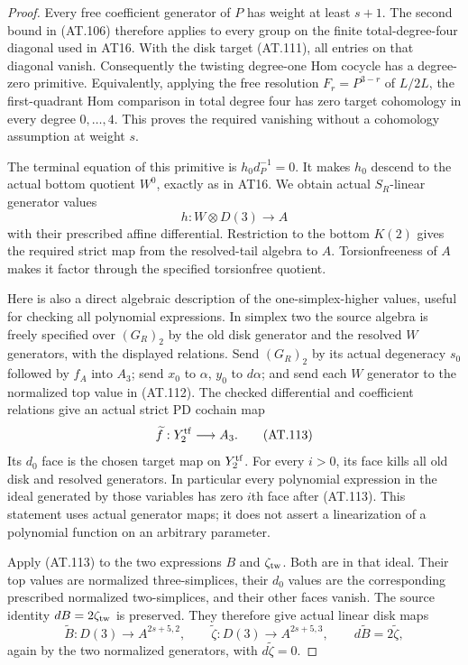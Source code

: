 \begin{proof}
Every free coefficient generator of $P$ has weight at
least $s+1$. The second bound in (AT.106) therefore applies
to every group on the finite total-degree-four diagonal
used in AT16. With the disk target (AT.111), all entries
on that diagonal vanish. Consequently the twisting
degree-one Hom cocycle has a degree-zero primitive.
Equivalently, applying the free resolution
$F_r=P^{3-r}$ of $L/2L$, the first-quadrant Hom comparison
in total degree four has zero target cohomology in every
degree $0,\ldots,4$. This proves the required vanishing
without a cohomology assumption at weight $s$.

The terminal equation of this primitive is
$h_0d_P^{-1}=0$. It makes $h_0$ descend to the actual
bottom quotient $W^0$, exactly as in AT16.
We obtain actual $S_R$-linear generator values
\[
                    h:W\otimes D(3)\longrightarrow A
 \tag{AT.112}
\]
with their prescribed affine differential.
Restriction to the bottom $K(2)$ gives the required
strict map from the resolved-tail algebra to $A$.
Torsionfreeness of $A$ makes it factor through the
specified torsionfree quotient.

Here is also a direct algebraic description of the
one-simplex-higher values, useful for checking all
polynomial expressions. In simplex two the source
algebra is freely specified over $(G_R)_2$ by the
old disk generator and the resolved $W$ generators,
with the displayed relations. Send $(G_R)_2$ by its
actual degeneracy $s_0$ followed by $f_A$ into $A_3$;
send $x_0$ to $\alpha$, $y_0$ to $d\alpha$; and send
each $W$ generator to the normalized top value in
(AT.112). The checked differential and coefficient
relations give an actual strict PD cochain map
\[
                         \widetilde f:Y_2^{\rm tf}\longrightarrow A_3.
 \tag{AT.113}
\]
Its $d_0$ face is the chosen target map on $Y_2^{\rm tf}$.
For every $i>0$, its face kills all old disk and resolved
generators. In particular every polynomial expression
in the ideal generated by those variables has zero
$i$th face after (AT.113). This statement uses actual
generator maps; it does not assert a linearization of a
polynomial function on an arbitrary parameter.

Apply (AT.113) to the two expressions $B$ and
$\zeta_{\rm tw}$. Both are in that ideal.
Their top values are normalized three-simplices,
their $d_0$ values are the corresponding prescribed
normalized two-simplices, and their other faces vanish.
The source identity $dB=2\zeta_{\rm tw}$ is preserved.
They therefore give actual linear disk maps
\[
 \widetilde B:D(3)\to A^{2s+5,2},\qquad
 \widetilde\zeta:D(3)\to A^{2s+5,3},
 \qquad d\widetilde B=2\widetilde\zeta,
 \tag{AT.114}
\]
again by the two normalized generators, with
$d\widetilde\zeta=0$.


\end{proof}
